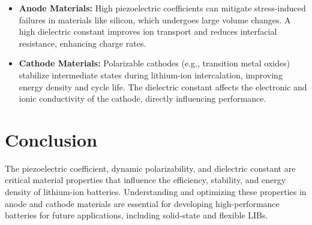 \documentclass[12pt]{article}
\begin{document}
\begin{itemize}
    \item \textbf{Anode Materials:} High piezoelectric coefficients can mitigate stress-induced failures in materials like silicon, which undergoes large volume changes. A high dielectric constant improves ion transport and reduces interfacial resistance, enhancing charge rates.
    \item \textbf{Cathode Materials:} Polarizable cathodes (e.g., transition metal oxides) stabilize intermediate states during lithium-ion intercalation, improving energy density and cycle life. The dielectric constant affects the electronic and ionic conductivity of the cathode, directly influencing performance.
\end{itemize}

\section*{Conclusion}
The piezoelectric coefficient, dynamic polarizability, and dielectric constant are critical material properties that influence the efficiency, stability, and energy density of lithium-ion batteries. Understanding and optimizing these properties in anode and cathode materials are essential for developing high-performance batteries for future applications, including solid-state and flexible LIBs.
\end{document}

